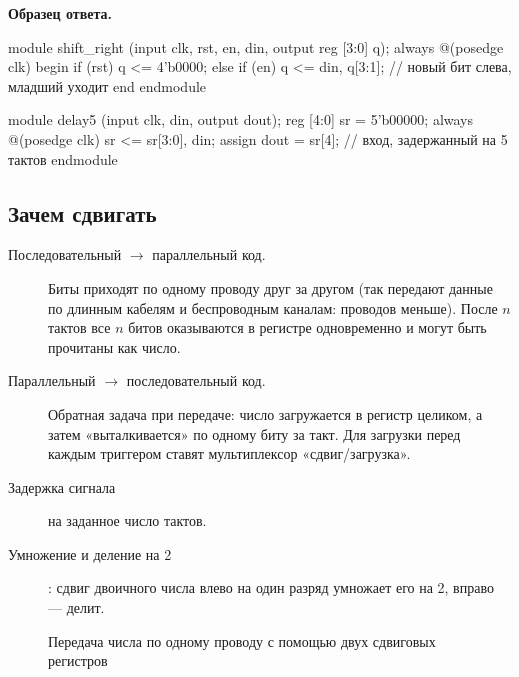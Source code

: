 \textbf{Образец ответа.}
\begin{vcode}
module shift_right (input clk, rst, en, din, output reg [3:0] q);
    always @(posedge clk) begin
        if (rst)     q <= 4'b0000;
        else if (en) q <= {din, q[3:1]};   // новый бит слева, младший уходит
    end
endmodule

module delay5 (input clk, din, output dout);
    reg [4:0] sr = 5'b00000;
    always @(posedge clk) sr <= {sr[3:0], din};
    assign dout = sr[4];                    // вход, задержанный на 5 тактов
endmodule
\end{vcode}

\subsection{Зачем сдвигать}

\begin{description}
  \item[Последовательный $\to$ параллельный код.] Биты приходят по одному
    проводу друг за другом (так передают данные по длинным кабелям и
    беспроводным каналам: проводов меньше). После
    $n$ тактов все $n$ битов оказываются в регистре одновременно и могут быть
    прочитаны как число. 
  \item[Параллельный $\to$ последовательный код.] Обратная задача при передаче:
    число загружается в регистр целиком, а затем «выталкивается» по одному
    биту за такт. Для загрузки перед каждым триггером ставят мультиплексор
    «сдвиг/загрузка».
  \item[Задержка сигнала] на заданное число тактов.
  \item[Умножение и деление на 2]: сдвиг двоичного числа влево на один разряд
    умножает его на 2, вправо --- делит.
\end{description}

\begin{figure}[H]
\centering
{}
\caption{Передача числа по одному проводу с помощью двух сдвиговых регистров}
\end{figure}

